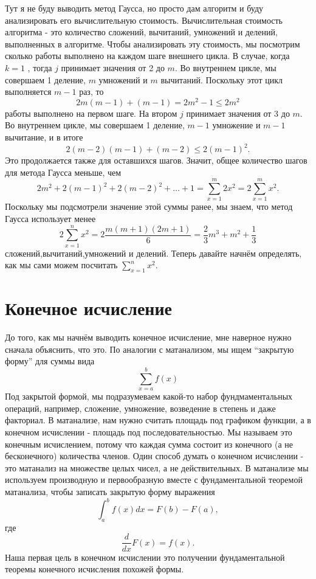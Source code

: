 \documentclass{article}
\begin{document}
Тут я не буду выводить метод Гаусса, но просто дам алгоритм и буду анализировать его вычислительную стоимость.
Вычислительная стоимость алгоритма - это количество сложений, вычитаний, умножений и делений, выполненных в алгоритме. Чтобы анализировать эту стоимость, мы посмотрим сколько работы выполнено на каждом шаге внешнего цикла. В случае, когда $k=1$ , тогда $j$ принимает значения от 2 до $m$. Во внутреннем цикле, мы совершаем 1 деление, $m$ умножений и $m$ вычитаний. Поскольку этот цикл выполняется $m-1$ раз, то
$$2m(m-1)+(m-1)=2m^2-1 \leq 2m^2$$
 работы выполнено на первом шаге. На втором $j$ принимает значения от 3 до $m$. Во внутреннем цикле, мы совершаем 1 деление, $m-1$ умножение и $m-1$ вычитание, и в итоге
$$2(m-2)(m-1)+(m-2) \leq 2(m-1)^2.$$
Это продолжается также для оставшихся шагов.
Значит, общее количество шагов для метода Гаусса меньше, чем
$$ 2m^2+2(m-1)^2+2(m-2)^2+\dots+1=\sum_{x=1}^m {2x^2} = 2\sum_{x=1}^m x^2 .$$
Поскольку мы подсмотрели значение этой суммы ранее, мы знаем, что метод Гаусса использует менее
$$2\sum_{x=1}^n x^2 =2\frac{m(m+1)(2m+1)}{6}=\frac{2}{3}m^3+m^2+\frac{1}{3}$$
сложений,вычитаний,умножений и делений. Теперь давайте начнём определять, как мы сами можем посчитать $\sum_{x=1}^n x^2$.

\section{Конечное исчисление}
До того, как мы начнём выводить конечное исчисление, мне наверное нужно сначала объяснить, что это. По аналогии с матанализом, мы ищем ``закрытую форму'' для суммы вида
$$\sum_{x=a}^b f(x)$$
Под закрытой формой, мы подразумеваем какой-то набор фундмаментальных операций, например, сложение, умножение, возведение в степень и даже факториал. В матанализе, нам нужно считать площадь под графиком функции, а в конечном исчислении - площадь под последовательностью. Мы называем это конечным исчислением, потому что каждая сумма состоит из конечного (а не бесконечного) количества членов. Один способ думать о конечном исчислении - это матанализ на множестве целых чисел, а не действительных.
В матанализе мы используем производную и первообразную вместе с фундаментальной теоремой матанализа, чтобы записать закрытую форму выражения
$$\int_a^b f(x) dx = F(b)-F(a),$$
где
$$\frac{d}{dx} F(x)=f(x).$$
Наша первая цель в конечном исчислении это получении фундаментальной теоремы конечного исчисления похожей формы.
\end{document}
